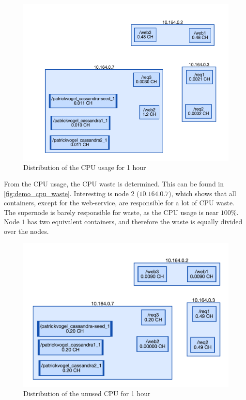 \begin{figure}
    \centering
    \includegraphics[width=\textwidth]{gfx/demo_cpu_cost}
    \caption{Distribution of the CPU usage for 1 hour}
    \label{fig:demo_cpu_cost}
\end{figure}

\noindent
From the CPU usage, the CPU waste is determined. This can be found in \autoref{fig:demo_cpu_waste}. Interesting is node $2$ ($10$.$164$.$0$.$7$), which shows that all containers, except for the web-service, are responsible for a lot of CPU waste. The supernode is barely responsible for waste, as the CPU usage is near $100\%$. Node $1$ has two equivalent containers, and therefore the waste is equally divided over the nodes.\\

\begin{figure}
    \centering
    \includegraphics[width=\textwidth]{gfx/demo_cpu_waste}
    \caption{Distribution of the unused CPU for 1 hour}
    \label{fig:demo_cpu_waste}
\end{figure}

